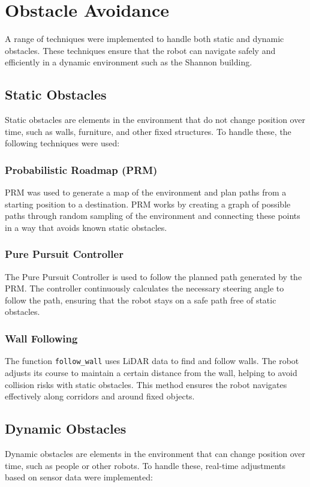 \documentclass{article}
\begin{document}
	\section{Obstacle Avoidance}
	A range of techniques were implemented to handle both static and dynamic obstacles. These techniques ensure that the robot can navigate safely and efficiently in a dynamic environment such as the Shannon building.
	
	\subsection{Static Obstacles}
	Static obstacles are elements in the environment that do not change position over time, such as walls, furniture, and other fixed structures. To handle these, the following techniques were used:
	
	\subsubsection{Probabilistic Roadmap (PRM)}
	PRM was used to generate a map of the environment and plan paths from a starting position to a destination. PRM works by creating a graph of possible paths through random sampling of the environment and connecting these points in a way that avoids known static obstacles.
	
	\subsubsection{Pure Pursuit Controller}
	The Pure Pursuit Controller is used to follow the planned path generated by the PRM. The controller continuously calculates the necessary steering angle to follow the path, ensuring that the robot stays on a safe path free of static obstacles.
	
	\subsubsection{Wall Following}
	The function \texttt{follow\_wall} uses LiDAR data to find and follow walls. The robot adjusts its course to maintain a certain distance from the wall, helping to avoid collision risks with static obstacles. This method ensures the robot navigates effectively along corridors and around fixed objects.
	
	\subsection{Dynamic Obstacles}
	Dynamic obstacles are elements in the environment that can change position over time, such as people or other robots. To handle these, real-time adjustments based on sensor data were implemented:
	
\end{document}
